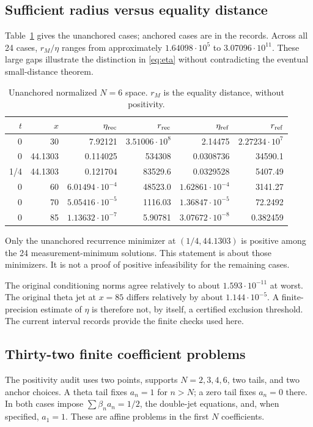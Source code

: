 \documentclass[11pt]{article}
\theoremstyle{remark}\newtheorem{remark}[theorem]{Remark}
\begin{document}
\subsection{Sufficient radius versus equality distance}
Table~\ref{tab:distance} gives the unanchored cases; anchored cases are in the records. Across all 24 cases, $r_M/\eta$ ranges from approximately $1.64098\cdot10^5$ to $3.07096\cdot10^{11}$. These large gaps illustrate the distinction in \eqref{eq:eta} without contradicting the eventual small-distance theorem.
\begin{table}[htbp]
\centering\small
\caption{Unanchored normalized $N=6$ space. $r_M$ is the equality distance, without positivity.}\label{tab:distance}
\begin{tabular}{@{}rr rrrr@{}}
\toprule
$t$&$x$&$\eta_{\rm rec}$&$r_{\rm rec}$&$\eta_{\rm ref}$&$r_{\rm ref}$\\\midrule
0&30&7.92121&$3.51006\cdot10^8$&2.14475&$2.27234\cdot10^7$\\
0&44.1303&0.114025&534308&0.0308736&34590.1\\
1/4&44.1303&0.121704&83529.6&0.0329528&5407.49\\
0&60&$6.01494\cdot10^{-4}$&48523.0&$1.62861\cdot10^{-4}$&3141.27\\
0&70&$5.05416\cdot10^{-5}$&1116.03&$1.36847\cdot10^{-5}$&72.2492\\
0&85&$1.13632\cdot10^{-7}$&5.90781&$3.07672\cdot10^{-8}$&0.382459\\\bottomrule
\end{tabular}
\end{table}
Only the unanchored recurrence minimizer at $(1/4,44.1303)$ is positive among the 24 measurement-minimum solutions. This statement is about those minimizers. It is not a proof of positive infeasibility for the remaining cases.

The original conditioning norms agree relatively to about $1.593\cdot10^{-11}$ at worst. The original theta jet at $x=85$ differs relatively by about $1.144\cdot10^{-5}$. A finite-precision estimate of $\eta$ is therefore not, by itself, a certified exclusion threshold. The current interval records provide the finite checks used here.

\subsection{Thirty-two finite coefficient problems}
The positivity audit uses two points, supports $N=2,3,4,6$, two tails, and two anchor choices. A theta tail fixes $a_n=1$ for $n>N$; a zero tail fixes $a_n=0$ there. In both cases impose $\sum\beta_na_n=1/2$, the double-jet equations, and, when specified, $a_1=1$. These are affine problems in the first $N$ coefficients.
\end{document}

